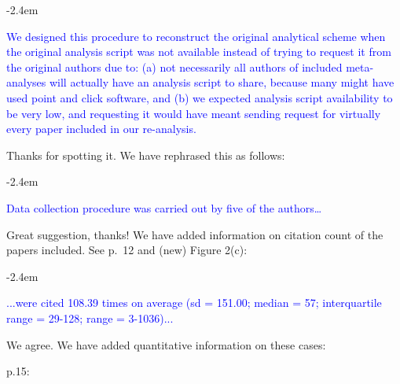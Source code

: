 \documentclass[draft]{article}
\renewenvironment{quote}{\begin{fquote}\advance\leftmargini -2.4em\begin{oldquote}}{\end{oldquote}\end{fquote}}
\newenvironment{fquote}
  {\def\FrameCommand{
	\fboxsep=0.6em %
	\fcolorbox{black}{white}}%
    \MakeFramed {\advance\hsize-2\width \FrameRestore}
    \begin{minipage}{\linewidth}
  }
  {\end{minipage}\endMakeFramed}
\begin{document}
\begin{quote}
\textcolor{blue}{We designed this procedure to reconstruct the original analytical scheme when the original analysis script was not available instead of trying to request it from the original authors due to: (a) not necessarily all authors of included meta-analyses will actually have an analysis script to share, because many might have used point and click software, and (b) we expected analysis script availability to be very low, and requesting it would have meant sending request for virtually every paper included in our re-analysis.}
\end{quote}


Thanks for spotting it. We have rephrased this as follows:

\begin{quote}
\textcolor{blue}{Data collection procedure was carried out by five of the authors…}
\end{quote}


Great suggestion, thanks! We have added information on citation count of the papers included. See p.~12 and (new) Figure 2(c):

\begin{quote}
\textcolor{blue}{...were cited 108.39 times on average (sd = 151.00; median = 57; interquartile range = 29-128; range = 3-1036)...}
\end{quote}


We agree. We have added quantitative information on these cases:

p.15:
\end{document}
